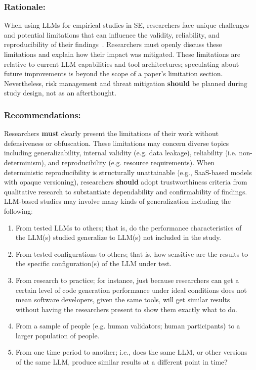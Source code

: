 \documentclass[smallextended]{svjour3}
\newcommand{\must}{\textbf{must}\xspace}
\newcommand{\should}{\textbf{should}\xspace}
\newcommand{\guidelinesubsubsection}[1]{\subsubsection{\bfseries #1:}}
\newcommand{\guidelinesubsubsection}[1]{\subsubsection{#1}}
\begin{document}
\guidelinesubsubsection{Rationale}

When using LLMs for empirical studies in SE, researchers face unique challenges and potential limitations that can influence the validity, reliability, and reproducibility of their findings~\cite{DBLP:conf/icse/SallouDP24}.
Researchers must openly discuss these limitations and explain how their impact was mitigated.
These limitations are relative to current LLM capabilities and tool architectures; speculating about future improvements is beyond the scope of a paper's limitation section.
Nevertheless, risk management and threat mitigation \should be planned during study design, not as an afterthought.

\guidelinesubsubsection{Recommendations}
Researchers \must clearly present the limitations of their work without defensiveness or obfuscation. These limitations may concern diverse topics including generalizability, internal validity (e.g. data leakage), reliability (i.e. non-determinism), and reproducibility (e.g. resource requirements). 
When deterministic reproducibility is structurally unattainable (e.g., SaaS-based models with opaque versioning), researchers \should adopt trustworthiness criteria from qualitative research to substantiate dependability and confirmability of findings.
LLM-based studies may involve many kinds of generalization including the following:
\begin{enumerate}
    \item From tested LLMs to others; that is, do the performance characteristics of the LLM(s) studied generalize to LLM(s) not included in the study.
    \item From tested configurations to others; that is, how sensitive are the results to the specific configuration(s) of the LLM under test. 
    \item From research to practice; for instance, just because researchers can get a certain level of code generation performance under ideal conditions does not mean software developers, given the same tools, will get similar results without having the researchers present to show them exactly what to do. 
    \item From a sample of people (e.g. human validators; human participants) to a larger population of people.
    \item From one time period to another; i.e., does the same LLM, or other versions of the same LLM, produce similar results at a different point in time?
\end{enumerate}
\end{document}

